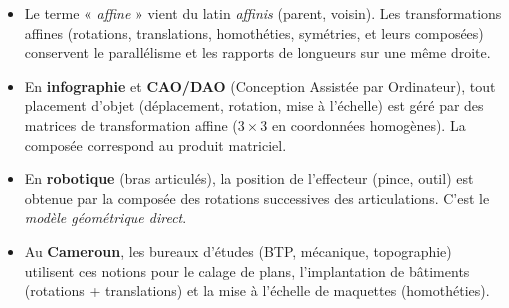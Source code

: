 \documentclass[11pt]{article}
\begin{document}
\begin{savaistu}
\begin{itemize}
\item Le terme « \emph{affine} » vient du latin \emph{affinis} (parent, voisin). Les transformations affines (rotations, translations, homothéties, symétries, et leurs composées) conservent le parallélisme et les rapports de longueurs sur une même droite.
\item En \textbf{infographie} et \textbf{CAO/DAO} (Conception Assistée par Ordinateur), tout placement d'objet (déplacement, rotation, mise à l'échelle) est géré par des matrices de transformation affine ($3 \times 3$ en coordonnées homogènes). La composée correspond au produit matriciel.
\item En \textbf{robotique} (bras articulés), la position de l'effecteur (pince, outil) est obtenue par la composée des rotations successives des articulations. C'est le \emph{modèle géométrique direct}.
\item Au \textbf{Cameroun}, les bureaux d'études (BTP, mécanique, topographie) utilisent ces notions pour le calage de plans, l'implantation de bâtiments (rotations + translations) et la mise à l'échelle de maquettes (homothéties).
\end{itemize}
\end{savaistu}
\end{document}
